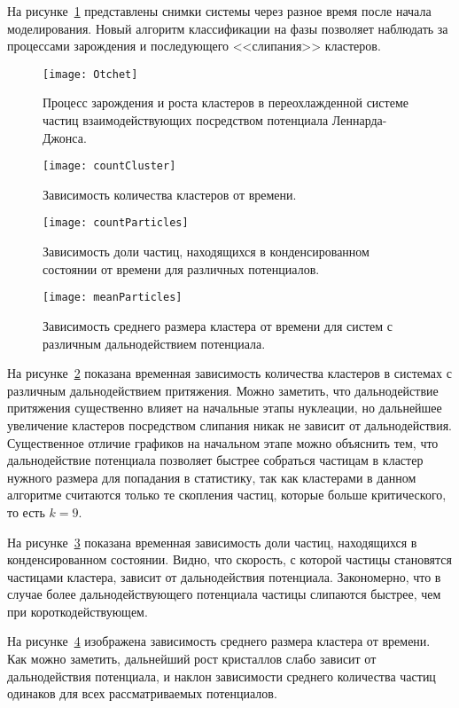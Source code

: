 На рисунке~\ref{otchet} представлены снимки системы через разное время после начала моделирования. Новый алгоритм классификации на фазы позволяет наблюдать за процессами зарождения и последующего <<слипания>> кластеров.


\begin{figure}[!t]
	 \centering
	 \texttt{[image: Otchet]}
	 \caption{Процесс зарождения и роста кластеров в переохлажденной системе частиц взаимодействующих посредством потенциала Леннарда-Джонса.}
	 \label{otchet}
\end{figure}


\begin{figure}[!t]
    \centering
    \texttt{[image: countCluster]}
    \caption{Зависимость количества кластеров от времени.}
    \label{countCluster}
\end{figure}

\begin{figure}[!t]
    \centering
    \texttt{[image: countParticles]}
    \caption{Зависимость доли частиц, находящихся в конденсированном состоянии от времени для различных потенциалов.}
    \label{countParticles}
\end{figure}

\begin{figure}[!t]
    \centering
    \texttt{[image: meanParticles]}
    \caption{Зависимость среднего размера кластера от времени для систем с различным дальнодействием потенциала.}
    \label{meanParticles}
\end{figure}

На рисунке~\ref{countCluster} показана временная зависимость количества кластеров в системах с различным дальнодействием притяжения. Можно заметить, что дальнодействие притяжения существенно влияет на начальные этапы нуклеации, но дальнейшее увеличение кластеров посредством слипания никак не зависит от дальнодействия. Существенное отличие графиков на начальном этапе можно объяснить тем, что дальнодействие потенциала позволяет быстрее собраться частицам в кластер нужного размера для попадания в статистику, так как кластерами в данном алгоритме считаются только те скопления частиц, которые больше критического, то есть $k = 9$.


На рисунке~\ref{countParticles} показана временная зависимость доли частиц, находящихся в конденсированном состоянии. Видно, что скорость, с которой частицы становятся частицами кластера, зависит от дальнодействия потенциала. Закономерно, что в случае более дальнодействующего потенциала частицы слипаются быстрее, чем при короткодействующем.


На рисунке~\ref{meanParticles} изображена зависимость среднего размера кластера от времени. Как можно заметить, дальнейший рост кристаллов слабо зависит от дальнодействия потенциала, и наклон зависимости среднего количества частиц одинаков для всех рассматриваемых потенциалов.
